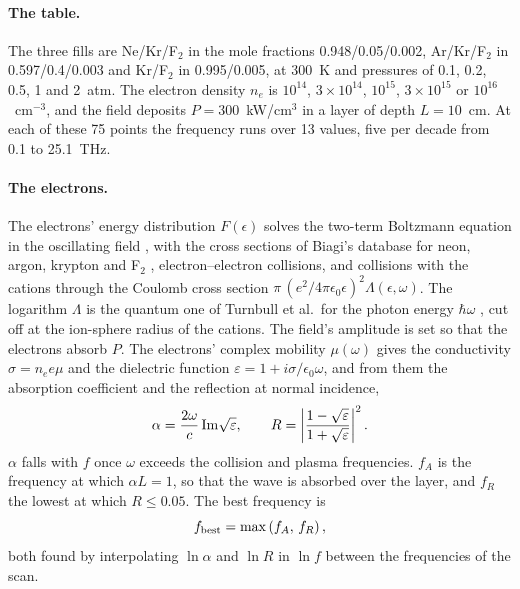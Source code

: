 \documentclass[11pt]{article}
\begin{document}
\paragraph{The table.}
The three fills are Ne/Kr/F$_2$ in the mole fractions 0.948/0.05/0.002, Ar/Kr/F$_2$ in 0.597/0.4/0.003 and
Kr/F$_2$ in 0.995/0.005, at 300~K and pressures of 0.1, 0.2, 0.5, 1 and 2~atm. The electron density $n_e$ is
$10^{14}$, $3\times10^{14}$, $10^{15}$, $3\times10^{15}$ or $10^{16}$~cm$^{-3}$, and the field deposits
$P=300$~kW/cm$^3$ in a layer of depth $L=10$~cm. At each of these 75 points the frequency runs over 13 values, five
per decade from 0.1 to 25.1~THz.

\paragraph{The electrons.}
The electrons' energy distribution $F(\epsilon)$ solves the two-term Boltzmann equation in the oscillating field
\cite{HP2005}, with the cross sections of Biagi's database for neon, argon, krypton and F$_2$ \cite{LXCat},
electron--electron collisions, and collisions with the cations through the Coulomb cross section
$\pi\,(e^2/4\pi\epsilon_0\epsilon)^2\Lambda(\epsilon,\omega)$. The logarithm $\Lambda$ is the quantum one of
Turnbull et al.\ for the photon energy $\hbar\omega$ \cite{T23,T24}, cut off at the ion-sphere radius of the
cations. The field's amplitude is set so that the electrons absorb $P$. The electrons' complex mobility
$\mu(\omega)$ gives the conductivity $\sigma=n_ee\mu$ and the dielectric function
$\varepsilon=1+i\sigma/\epsilon_0\omega$, and from them the absorption coefficient and the reflection at normal
incidence,
\begin{equation}
\alpha=\frac{2\omega}{c}\,{\rm Im}\sqrt{\varepsilon},\qquad
R=\left|\frac{1-\sqrt{\varepsilon}}{1+\sqrt{\varepsilon}}\right|^2 .
\label{eq:optics}
\end{equation}
$\alpha$ falls with $f$ once $\omega$ exceeds the collision and plasma frequencies. $f_A$ is the frequency at
which $\alpha L=1$, so that the wave is absorbed over the layer, and $f_R$ the lowest at which $R\le0.05$. The
best frequency is
\begin{equation}
f_{\rm best}=\max\left(f_A,\,f_R\right),
\label{eq:fbest}
\end{equation}
both found by interpolating $\ln\alpha$ and $\ln R$ in $\ln f$ between the frequencies of the scan.
\end{document}
